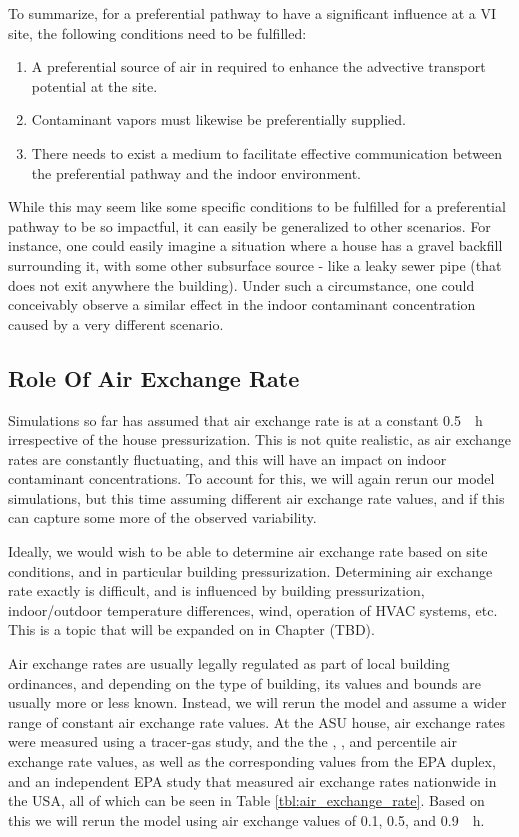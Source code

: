 To summarize, for a preferential pathway to have a significant influence at a VI site, the following conditions need to be fulfilled:
\begin{enumerate}
  \item A preferential source of air in required to enhance the advective transport potential at the site.
  \item Contaminant vapors must likewise be preferentially supplied.
  \item There needs to exist a medium to facilitate effective communication between the preferential pathway and the indoor environment.
\end{enumerate}
While this may seem like some specific conditions to be fulfilled for a preferential pathway to be so impactful, it can easily be generalized to other scenarios.
For instance, one could easily imagine a situation where a house has a gravel backfill surrounding it, with some other subsurface source - like a leaky sewer pipe (that does not exit anywhere the building).
Under such a circumstance, one could conceivably observe a similar effect in the indoor contaminant concentration caused by a very different scenario.\par

\subsection{Role Of Air Exchange Rate}

Simulations so far has assumed that air exchange rate is at a constant \SI{0.5}{\per\hour} irrespective of the house pressurization.
This is not quite realistic, as air exchange rates are constantly fluctuating, and this will have an impact on indoor contaminant concentrations.
To account for this, we will again rerun our model simulations, but this time assuming different air exchange rate values, and if this can capture some more of the observed variability.\par

Ideally, we would wish to be able to determine air exchange rate based on site conditions, and in particular building pressurization.
Determining air exchange rate exactly is difficult, and is influenced by building pressurization, indoor/outdoor temperature differences, wind, operation of HVAC systems, etc.
This is a topic that will be expanded on in Chapter (TBD).\par %

Air exchange rates are usually legally regulated as part of local building ordinances, and depending on the type of building, its values and bounds are usually more or less known.
Instead, we will rerun the model and assume a wider range of constant air exchange rate values.
At the ASU house, air exchange rates were measured using a tracer-gas study, and the the , , and  percentile air exchange rate values, as well as the corresponding values from the EPA duplex, and an independent EPA study that measured air exchange rates nationwide in the USA, all of which can be seen in Table \ref{tbl:air_exchange_rate}.
Based on this we will rerun the model using air exchange values of 0.1, 0.5, and \SI{0.9}{\per\hour}.\par

